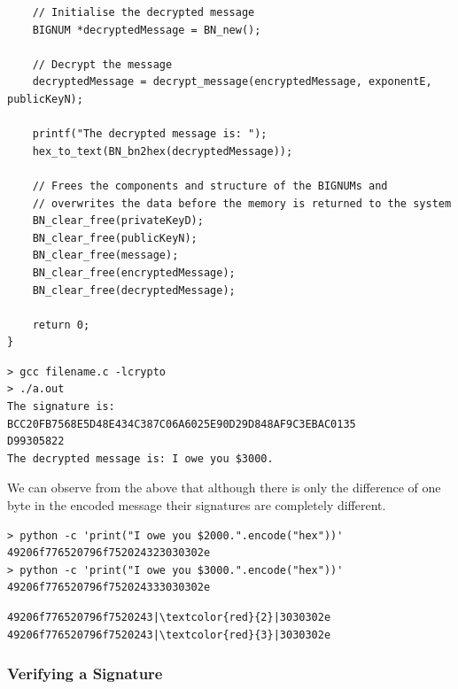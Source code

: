 \documentclass[12pt]{article}
\begin{document}
\begin{lstlisting}
    // Initialise the decrypted message
    BIGNUM *decryptedMessage = BN_new();

    // Decrypt the message
    decryptedMessage = decrypt_message(encryptedMessage, exponentE, publicKeyN);

    printf("The decrypted message is: ");
    hex_to_text(BN_bn2hex(decryptedMessage));

    // Frees the components and structure of the BIGNUMs and
    // overwrites the data before the memory is returned to the system            
    BN_clear_free(privateKeyD); 
    BN_clear_free(publicKeyN);
    BN_clear_free(message);
    BN_clear_free(encryptedMessage);
    BN_clear_free(decryptedMessage);

    return 0;    
}
\end{lstlisting}

\begin{framed}
    \begin{verbatim}
> gcc filename.c -lcrypto
> ./a.out
The signature is: BCC20FB7568E5D48E434C387C06A6025E90D29D848AF9C3EBAC0135
D99305822
The decrypted message is: I owe you $3000.
    \end{verbatim}
\end{framed}

\noindent
We can observe from the above that although there is only the difference of
one byte in the encoded message their signatures are completely different.

\begin{framed}
    \begin{verbatim}
> python -c 'print("I owe you $2000.".encode("hex"))'
49206f776520796f752024323030302e
> python -c 'print("I owe you $3000.".encode("hex"))'
49206f776520796f752024333030302e
    \end{verbatim}
    \begin{lstlisting}[frame=none]
49206f776520796f7520243|\textcolor{red}{2}|3030302e
49206f776520796f7520243|\textcolor{red}{3}|3030302e
    \end{lstlisting}
\end{framed}



\newpage

\subsubsection{Verifying a Signature}
\end{document}
